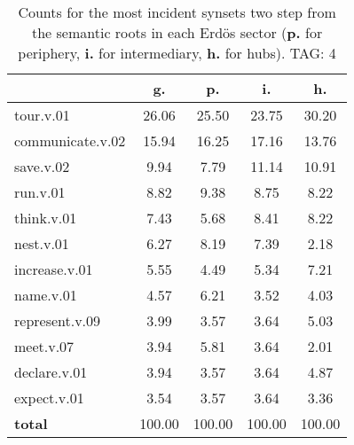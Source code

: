 \begin{table}[h!]
\begin{center}
\begin{tabular}{| l | c | c | c | c |}\hline
 & g. & p. & i. & h. \\\hline
tour.v.01 & 26.06  & 25.50  & 23.75  & 30.20 \\\hline
communicate.v.02 & 15.94  & 16.25  & 17.16  & 13.76 \\\hline
save.v.02 & 9.94  & 7.79  & 11.14  & 10.91 \\\hline
run.v.01 & 8.82  & 9.38  & 8.75  & 8.22 \\\hline
think.v.01 & 7.43  & 5.68  & 8.41  & 8.22 \\\hline
nest.v.01 & 6.27  & 8.19  & 7.39  & 2.18 \\\hline
increase.v.01 & 5.55  & 4.49  & 5.34  & 7.21 \\\hline
name.v.01 & 4.57  & 6.21  & 3.52  & 4.03 \\\hline
represent.v.09 & 3.99  & 3.57  & 3.64  & 5.03 \\\hline
meet.v.07 & 3.94  & 5.81  & 3.64  & 2.01 \\\hline
declare.v.01 & 3.94  & 3.57  & 3.64  & 4.87 \\\hline
expect.v.01 & 3.54  & 3.57  & 3.64  & 3.36 \\\hline
{{\bf total}} & 100.00  & 100.00  & 100.00  & 100.00 \\\hline
\end{tabular}
\caption{Counts for the most incident synsets two step from the semantic roots in each Erd\"os sector ({\bf p.} for periphery, {\bf i.} for intermediary, {\bf h.} for hubs). TAG: 4}
\end{center}
\end{table}